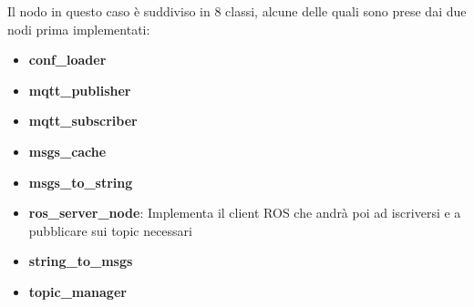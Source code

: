 \noindent Il nodo in questo caso è suddiviso in 8 classi, alcune delle quali sono prese dai due nodi prima implementati:

\begin{itemize}
  \item \textbf{conf\_loader}
  \item \textbf{mqtt\_publisher}
  \item \textbf{mqtt\_subscriber}
  \item \textbf{msgs\_cache}
  \item \textbf{msgs\_to\_string}
  \item \textbf{ros\_server\_node}: Implementa il client ROS che andrà poi ad iscriversi e a pubblicare sui topic necessari
  \item \textbf{string\_to\_msgs}
  \item \textbf{topic\_manager}
\end{itemize}
